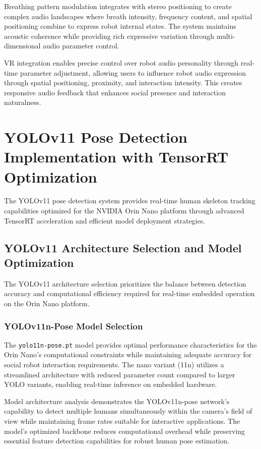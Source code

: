 Breathing pattern modulation integrates with stereo positioning to create complex audio landscapes where breath intensity, frequency content, and spatial positioning combine to express robot internal states. The system maintains acoustic coherence while providing rich expressive variation through multi-dimensional audio parameter control.

VR integration enables precise control over robot audio personality through real-time parameter adjustment, allowing users to influence robot audio expression through spatial positioning, proximity, and interaction intensity. This creates responsive audio feedback that enhances social presence and interaction naturalness.

\section{YOLOv11 Pose Detection Implementation with TensorRT Optimization}

The YOLOv11 pose detection system provides real-time human skeleton tracking capabilities optimized for the NVIDIA Orin Nano platform through advanced TensorRT acceleration and efficient model deployment strategies.

\subsection{YOLOv11 Architecture Selection and Model Optimization}

The YOLOv11 architecture selection prioritizes the balance between detection accuracy and computational efficiency required for real-time embedded operation on the Orin Nano platform.

\subsubsection{YOLOv11n-Pose Model Selection}

The \texttt{yolo11n-pose.pt} model provides optimal performance characteristics for the Orin Nano's computational constraints while maintaining adequate accuracy for social robot interaction requirements. The nano variant (11n) utilizes a streamlined architecture with reduced parameter count compared to larger YOLO variants, enabling real-time inference on embedded hardware.

Model architecture analysis demonstrates the YOLOv11n-pose network's capability to detect multiple humans simultaneously within the camera's field of view while maintaining frame rates suitable for interactive applications. The model's optimized backbone reduces computational overhead while preserving essential feature detection capabilities for robust human pose estimation.

